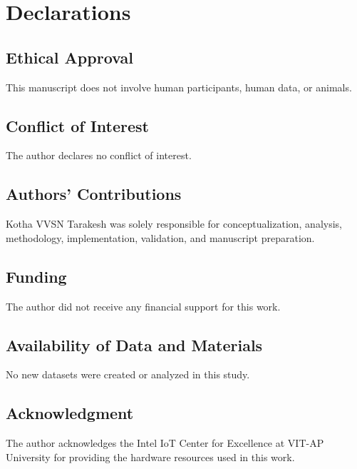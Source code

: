 \documentclass[a4paper,fleqn]{cas-dc}
\numberwithin{equation}{section}
\begin{document}
\section*{Declarations}

\subsection*{Ethical Approval}
This manuscript does not involve human participants, human data, or animals.

\subsection*{Conflict of Interest}
The author declares no conflict of interest.

\subsection*{Authors' Contributions}
Kotha VVSN Tarakesh was solely responsible for conceptualization, analysis, methodology, implementation, validation, and manuscript preparation.

\subsection*{Funding}
The author did not receive any financial support for this work.

\subsection*{Availability of Data and Materials}
No new datasets were created or analyzed in this study.

\subsection*{Acknowledgment}
The author acknowledges the Intel IoT Center for Excellence at VIT-AP University for providing the hardware resources used in this work.

\nocite{*}


\end{document}
